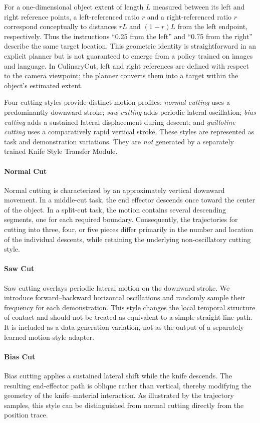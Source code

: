 For a one-dimensional object extent of length $L$ measured between its left and right reference points, a left-referenced ratio $r$ and a right-referenced ratio $r$ correspond conceptually to distances $rL$ and $(1-r)L$ from the left endpoint, respectively. Thus the instructions ``0.25 from the left'' and ``0.75 from the right'' describe the same target location. This geometric identity is straightforward in an explicit planner but is not guaranteed to emerge from a policy trained on images and language. In CulinaryCut, left and right references are defined with respect to the camera viewpoint; the planner converts them into a target within the object's estimated extent.

Four cutting styles provide distinct motion profiles: \emph{normal cutting} uses a predominantly downward stroke; \emph{saw cutting} adds periodic lateral oscillation; \emph{bias cutting} adds a sustained lateral displacement during descent; and \emph{guillotine cutting} uses a comparatively rapid vertical stroke. These styles are represented as task and demonstration variations. They are \emph{not} generated by a separately trained Knife Style Transfer Module.

\paragraph*{Normal Cut}
Normal cutting is characterized by an approximately vertical downward movement. In a middle-cut task, the end effector descends once toward the center of the object. In a split-cut task, the motion contains several descending segments, one for each required boundary. Consequently, the trajectories for cutting into three, four, or five pieces differ primarily in the number and location of the individual descents, while retaining the underlying non-oscillatory cutting style.

\paragraph*{Saw Cut}
Saw cutting overlays periodic lateral motion on the downward stroke. We introduce forward--backward horizontal oscillations and randomly sample their frequency for each demonstration. This style changes the local temporal structure of contact and should not be treated as equivalent to a simple straight-line path. It is included as a data-generation variation, not as the output of a separately learned motion-style adapter.

\paragraph*{Bias Cut}
Bias cutting applies a sustained lateral shift while the knife descends. The resulting end-effector path is oblique rather than vertical, thereby modifying the geometry of the knife--material interaction. As illustrated by the trajectory samples, this style can be distinguished from normal cutting directly from the position trace.

